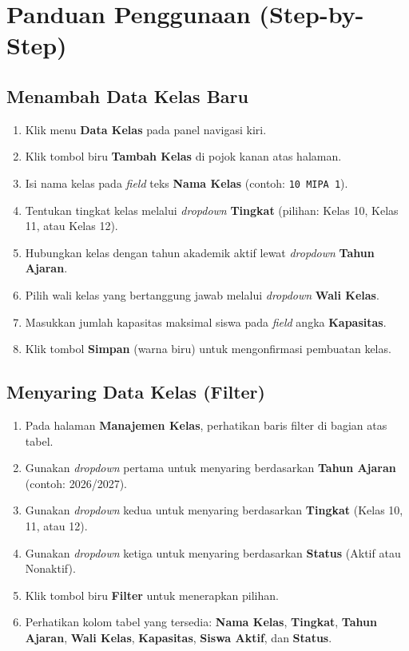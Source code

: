 \section{Panduan Penggunaan (Step-by-Step)}

\subsection{Menambah Data Kelas Baru}
\begin{enumerate}
    \item Klik menu \textbf{Data Kelas} pada panel navigasi kiri.
    \item Klik tombol biru \textbf{Tambah Kelas} di pojok kanan atas halaman.
    \item Isi nama kelas pada \textit{field} teks \textbf{Nama Kelas} (contoh: \texttt{10 MIPA 1}).
    \item Tentukan tingkat kelas melalui \textit{dropdown} \textbf{Tingkat} (pilihan: Kelas 10, Kelas 11, atau Kelas 12).
    \item Hubungkan kelas dengan tahun akademik aktif lewat \textit{dropdown} \textbf{Tahun Ajaran}.
    \item Pilih wali kelas yang bertanggung jawab melalui \textit{dropdown} \textbf{Wali Kelas}.
    \item Masukkan jumlah kapasitas maksimal siswa pada \textit{field} angka \textbf{Kapasitas}.
    \item Klik tombol \textbf{Simpan} (warna biru) untuk mengonfirmasi pembuatan kelas.
\end{enumerate}

\subsection{Menyaring Data Kelas (Filter)}
\begin{enumerate}
    \item Pada halaman \textbf{Manajemen Kelas}, perhatikan baris filter di bagian atas tabel.
    \item Gunakan \textit{dropdown} pertama untuk menyaring berdasarkan \textbf{Tahun Ajaran} (contoh: 2026/2027).
    \item Gunakan \textit{dropdown} kedua untuk menyaring berdasarkan \textbf{Tingkat} (Kelas 10, 11, atau 12).
    \item Gunakan \textit{dropdown} ketiga untuk menyaring berdasarkan \textbf{Status} (Aktif atau Nonaktif).
    \item Klik tombol biru \textbf{Filter} untuk menerapkan pilihan.
    \item Perhatikan kolom tabel yang tersedia: \textbf{Nama Kelas}, \textbf{Tingkat}, \textbf{Tahun Ajaran}, \textbf{Wali Kelas}, \textbf{Kapasitas}, \textbf{Siswa Aktif}, dan \textbf{Status}.
\end{enumerate}

